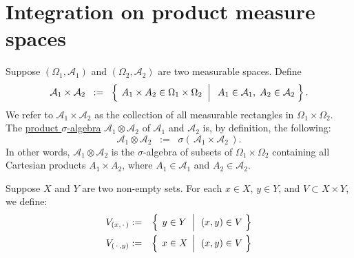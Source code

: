 

\section{Integration on product measure spaces}
\setcounter{theorem}{0}
\setcounter{equation}{0}

\renewcommand{\theenumi}{\roman{enumi}}
\renewcommand{\labelenumi}{\textnormal{(\theenumi)}$\;\;$}

\newcommand{\EAoneAtwo}{\mathcal{E}\!\left(\mathcal{A}_{1}\times\mathcal{A}_{2}\right)}


\begin{definition}
\mbox{}
\vskip 0.1cm
\noindent
Suppose $\left(\Omega_{1},\mathcal{A}_{1}\right)$ and $\left(\Omega_{2},\mathcal{A}_{2}\right)$
are two measurable spaces.
Define
\begin{equation*}
\mathcal{A}_{1}\times\mathcal{A}_{2}
\;\; := \;\;
\left\{\;
\left.
A_{1} \times A_{2} \overset{{\color{white}.}}{\in} \Omega_{1} \times \Omega_{2}
\;\;\right\vert\;\;
A_{1} \in \mathcal{A}_{1},\;
A_{2} \in \mathcal{A}_{2}
\;\right\}.
\end{equation*}
We refer to $\mathcal{A}_{1}\times\mathcal{A}_{2}$ as the collection of all measurable rectangles in
$\Omega_{1}\times\Omega_{2}$.
The \underline{product $\sigma$-algebra} $\mathcal{A}_{1}\otimes\mathcal{A}_{2}$
of $\mathcal{A}_{1}$ and $\mathcal{A}_{2}$ is, by definition, the following:
\begin{equation*}
\mathcal{A}_{1}\otimes\mathcal{A}_{2}
\;\; := \;\;
\sigma\!\left(\, \mathcal{A}_{1}\times\mathcal{A}_{2} \,\right).
\end{equation*}
In other words, $\mathcal{A}_{1} \otimes \mathcal{A}_{2}$ is the $\sigma$-algebra of subsets of $\Omega_{1} \times \Omega_{2}$
containing all Cartesian products $A_{1} \times A_{2}$, where $A_{1} \in \mathcal{A}_{1}$ and $A_{2} \in \mathcal{A}_{2}$.
\end{definition}

\begin{definition}
\mbox{}
\vskip 0.1cm
\noindent
Suppose $X$ and $Y$ are two non-empty sets.
For each $x \in X$, $y \in Y$, and $V \subset X \times Y$, we define:
\begin{eqnarray*}
V_{(x,\,\cdot\,)} &:=& \left\{\;\left. y \overset{{\color{white}.}}{\in} Y \;\;\right\vert\;\, (x,y) \in V \;\right\}
\\
V_{(\,\cdot\,,y)} &:=& \left\{\;\left. x \overset{{\color{white}.}}{\in} X \,\;\right\vert\;\, (x,y) \in V \;\right\}
\end{eqnarray*}
\end{definition}

